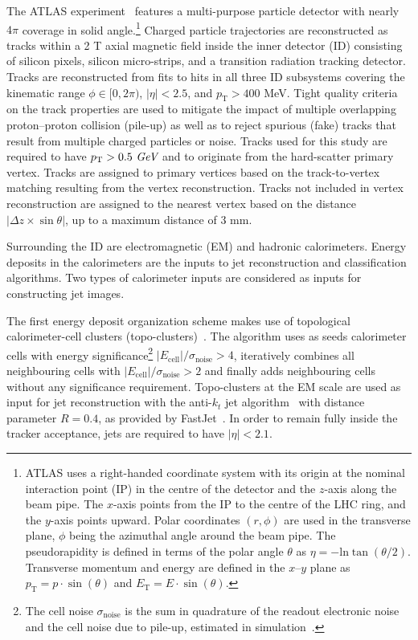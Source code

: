 The ATLAS experiment~\cite{Detector} features a multi-purpose particle detector with nearly $4\pi$ coverage in solid angle.\footnote{
ATLAS uses a right-handed coordinate system with its origin at the nominal interaction point (IP) in the centre of the detector and the $z$-axis along the beam pipe.  The $x$-axis points from the IP to the centre of the LHC ring, and the $y$-axis points upward.  Polar coordinates $(r,\phi)$ are used in the transverse plane, $\phi$ being the azimuthal angle around the beam pipe.  The pseudorapidity is defined in terms of the polar angle $\theta$ as $\eta=-\mathrm{ln}\tan(\theta/2)$.  Transverse momentum and energy are defined in the $x$--$y$ plane as $p_\text{T}=p\cdot \sin(\theta)$ and $E_\text{T}=E\cdot\sin(\theta)$.
}  Charged particle trajectories are reconstructed as tracks within a 2 T axial magnetic field inside the inner detector (ID) consisting of silicon pixels, silicon micro-strips, and a transition radiation tracking detector.  Tracks are reconstructed from fits to hits in all three ID subsystems covering the kinematic range $\phi\in[0,2\pi)$,  $|\eta|<2.5$, and $p_\text{T}>400$ MeV.  Tight quality criteria~\cite{ATL-PHYS-PUB-2015-051} on the track properties are used to mitigate the impact of multiple overlapping proton--proton collision (pile-up) as well as to reject spurious (fake) tracks that result from multiple charged particles or noise.
Tracks used for this study are required to have $p_\text{T} > 0.5~\textit{GeV}$ and to originate from the hard-scatter primary vertex. 
Tracks are assigned to primary vertices based on the track-to-vertex matching resulting from the vertex reconstruction.
Tracks not included in vertex reconstruction are assigned to the nearest vertex based on the
distance $|\Delta z \times \sin\theta|$, up to a maximum distance of 3 mm.

Surrounding the ID are electromagnetic (EM) and hadronic calorimeters.  
Energy deposits in the calorimeters are the inputs to jet reconstruction and classification
algorithms.
Two types of calorimeter inputs are considered as inputs for constructing jet images.

The first energy deposit organization scheme makes use of topological calorimeter-cell 
clusters (topo-clusters)~\cite{Aad:2016upy}.
The algorithm uses as seeds calorimeter cells
with energy significance\footnote{The cell noise 
$\sigma_\text{noise}$ is the sum in quadrature of the readout electronic noise and the cell noise due to
pile-up, estimated in simulation~\cite{Aad:2016upy,ATLASjets}.} $|E_\text{cell}|/\sigma_\text{noise}>4$,
iteratively combines all neighbouring cells with
$|E_\text{cell}|/\sigma_\text{noise}>2$ and finally adds neighbouring cells
without any significance requirement.
Topo-clusters at the EM scale are used as input for jet reconstruction with the anti-$k_t$ jet algorithm~\cite{Cacciari:2008gp} 
with distance parameter $R=0.4$, as provided by FastJet~\cite{Cacciari:2011ma}.  
In order to remain fully inside the tracker acceptance, jets are required to have $|\eta|<2.1$.

